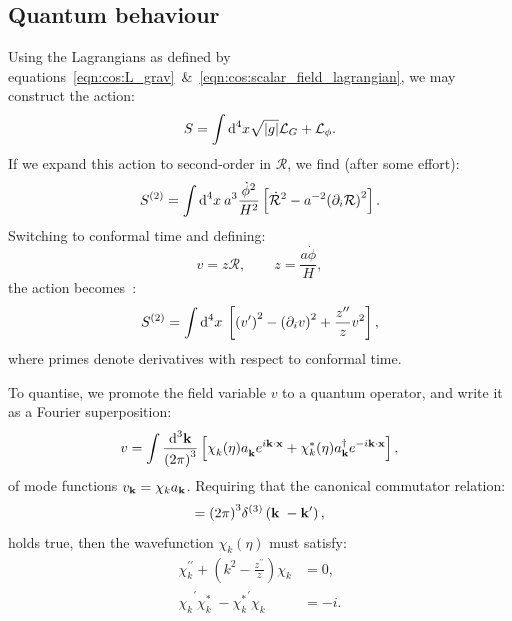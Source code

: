 \subsection{Quantum behaviour}
Using the Lagrangians as defined by equations~\eqref{eqn:cos:L_grav}~\&~\eqref{eqn:cos:scalar_field_lagrangian}, we may construct the action:
\begin{equation}
  S = \int \d[4]{x}\sqrt{|g|}\mathcal{L}_G + \mathcal{L}_\phi.
\end{equation}
If we expand this action to second-order in \(\mathcal{R}\), we find (after some effort):
\begin{equation}
  S^{(2)} = \int \d[4]{x}\: a^3 \frac{\dot{\phi}^2}{H^2}\left[ \mathcal{\dot{R}}^2 -a^{-2}{\left( \partial_i\mathcal{R} \right)}^2 \right].
\end{equation}
Switching to conformal time and defining:
\begin{equation}
  v = z \mathcal{R}, \qquad
  z = \frac{a \dot{\phi}}{H},
\end{equation}
the action becomes~\citep[App B]{Baumann+2009}:
\begin{equation}
  S^{(2)} = \int \d[4]{x}\: \left[ {\left( v^{\prime} \right)}^2 - {\left( \partial_i v \right)}^2 + \frac{z^{\prime\prime}}{z}v^2\right],
\end{equation}
where primes denote derivatives with respect to conformal time.

To quantise, we promote the field variable \(v\) to a quantum operator, and write it as a Fourier superposition:
\begin{equation}
  v = \int \frac{\d[3]{\vk}}{{\left( 2\pi \right)}^3}
  \left[ 
    \chi_k^{\phantom\ast}(\eta) a_\vk^{\phantom\dagger}e^{i\vk\cdot\vx} + 
    \chi_k^\ast(\eta) a_\vk^{\dagger}e^{-i\vk\cdot\vx}  
  \right],
  \label{eqn:cos:mode_func_sum}
\end{equation}
of mode functions \(v_\vk = \chi_k a_\vk\).
Requiring that the canonical commutator relation:
\begin{equation}
  [ a_{\vk^{\phantom\prime}}^{\phantom\dagger}, a_{\vk^{\prime}}^{\dagger}] = {\left( 2\pi \right)}^3\delta^{(3)}\left( \vk^{\phantom\prime}-\vk^{\prime} \right),
  \label{eqn:cos:commutator}
\end{equation}
holds true, then the wavefunction \(\chi_k(\eta)\) must satisfy:
\begin{align}
  \chi_k^{\prime\prime} + \left( k^2 - \frac{z^{\prime\prime}}{z} \right) \chi_k &=0,
  \label{eqn:cos:mode_func}
  \\
  {\chi_k^{\phantom\ast}}^{\prime} 
  {\chi_k^{\ast}}^{\phantom\prime} 
  -
  {\chi_k^{\ast}}^{\prime} 
  {\chi_k^{\phantom\ast}}^{\phantom\prime} 
  &= -i.
  \label{eqn:cos:mode_func_normalisation}
\end{align}
